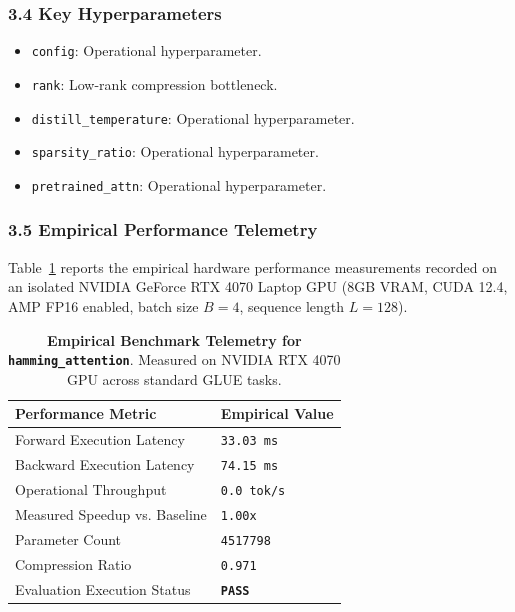 \subsubsection*{3.4 Key Hyperparameters}
\begin{itemize}
    \item \texttt{config}: Operational hyperparameter.
    \item \texttt{rank}: Low-rank compression bottleneck.
    \item \texttt{distill\_temperature}: Operational hyperparameter.
    \item \texttt{sparsity\_ratio}: Operational hyperparameter.
    \item \texttt{pretrained\_attn}: Operational hyperparameter.
\end{itemize}

\subsubsection*{3.5 Empirical Performance Telemetry}
Table~\ref{tab:telemetry_hamming\_attention} reports the empirical hardware performance measurements recorded on an isolated NVIDIA GeForce RTX 4070 Laptop GPU (8GB VRAM, CUDA 12.4, AMP FP16 enabled, batch size $B=4$, sequence length $L=128$).

\begin{table}[h]
\centering
\small
\caption{\textbf{Empirical Benchmark Telemetry for \texttt{hamming\_attention}}. Measured on NVIDIA RTX 4070 GPU across standard GLUE tasks.}
\label{tab:telemetry_hamming\_attention}
\begin{tabularx}{\columnwidth}{lX}
\toprule
\textbf{Performance Metric} & \textbf{Empirical Value} \\
\midrule
Forward Execution Latency & \texttt{33.03 ms} \\
Backward Execution Latency & \texttt{74.15 ms} \\
Operational Throughput & \texttt{0.0 tok/s} \\
Measured Speedup vs. Baseline & \texttt{1.00x} \\
Parameter Count & \texttt{4517798} \\
Compression Ratio & \texttt{0.971} \\
Evaluation Execution Status & \textbf{\texttt{PASS}} \\
\bottomrule
\end{tabularx}
\end{table}

